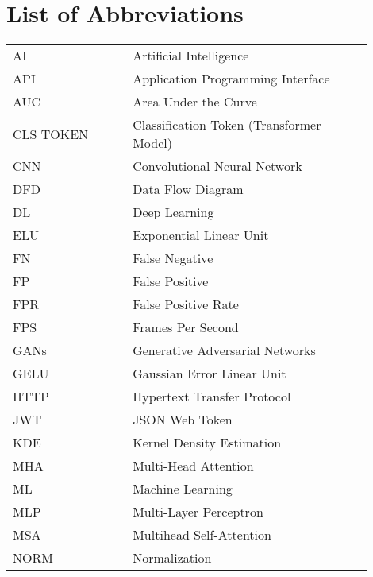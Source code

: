 \section*{List of Abbreviations}
\begin{flushleft}
    \begin{longtable}{@{}p{0.3\linewidth}p{0.6\linewidth}@{}}
        \endhead
        \endfoot
        \endlastfoot
        AI        & Artificial Intelligence                  \\
        API       & Application Programming Interface        \\
        AUC       & Area Under the Curve                     \\
        CLS TOKEN & Classification Token (Transformer Model) \\
        CNN       & Convolutional Neural Network             \\
        DFD       & Data Flow Diagram                        \\
        DL        & Deep Learning                            \\
        ELU       & Exponential Linear Unit                  \\
        FN        & False Negative                           \\
        FP        & False Positive                           \\
        FPR       & False Positive Rate                      \\
        FPS       & Frames Per Second                        \\
        GANs      & Generative Adversarial Networks          \\
        GELU      & Gaussian Error Linear Unit               \\
        HTTP      & Hypertext Transfer Protocol              \\
        JWT       & JSON Web Token                           \\
        KDE       & Kernel Density Estimation                \\
        MHA       & Multi-Head Attention                     \\
        ML        & Machine Learning                         \\
        MLP       & Multi-Layer Perceptron                   \\
        MSA       & Multihead Self-Attention                 \\
        NORM      & Normalization                            \\

\end{longtable}
\end{flushleft}
